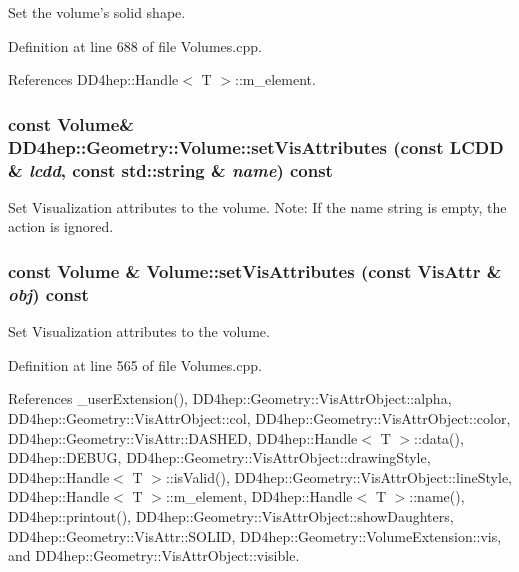 Set the volume's solid shape. 

Definition at line 688 of file Volumes.cpp.

References DD4hep::Handle$<$ T $>$::m\_\-element.\hypertarget{class_d_d4hep_1_1_geometry_1_1_volume_a2aa60c41207795302295e8147e2dc3d9}{
\subsubsection[{setVisAttributes}]{\setlength{\rightskip}{0pt plus 5cm}const {\bf Volume}\& DD4hep::Geometry::Volume::setVisAttributes (const {\bf LCDD} \& {\em lcdd}, \/  const std::string \& {\em name}) const}}
\label{class_d_d4hep_1_1_geometry_1_1_volume_a2aa60c41207795302295e8147e2dc3d9}


Set Visualization attributes to the volume. Note: If the name string is empty, the action is ignored. \hypertarget{class_d_d4hep_1_1_geometry_1_1_volume_a5db10a2a883d77b2654fe1875d5d7bb5}{
\subsubsection[{setVisAttributes}]{\setlength{\rightskip}{0pt plus 5cm}const {\bf Volume} \& Volume::setVisAttributes (const {\bf VisAttr} \& {\em obj}) const}}
\label{class_d_d4hep_1_1_geometry_1_1_volume_a5db10a2a883d77b2654fe1875d5d7bb5}


Set Visualization attributes to the volume. 

Definition at line 565 of file Volumes.cpp.

References \_\-userExtension(), DD4hep::Geometry::VisAttrObject::alpha, DD4hep::Geometry::VisAttrObject::col, DD4hep::Geometry::VisAttrObject::color, DD4hep::Geometry::VisAttr::DASHED, DD4hep::Handle$<$ T $>$::data(), DD4hep::DEBUG, DD4hep::Geometry::VisAttrObject::drawingStyle, DD4hep::Handle$<$ T $>$::isValid(), DD4hep::Geometry::VisAttrObject::lineStyle, DD4hep::Handle$<$ T $>$::m\_\-element, DD4hep::Handle$<$ T $>$::name(), DD4hep::printout(), DD4hep::Geometry::VisAttrObject::showDaughters, DD4hep::Geometry::VisAttr::SOLID, DD4hep::Geometry::VolumeExtension::vis, and DD4hep::Geometry::VisAttrObject::visible.

